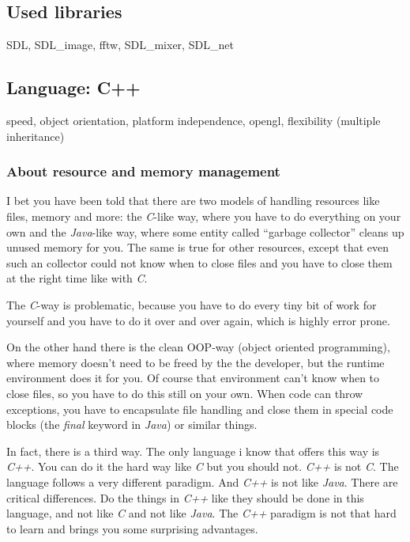 \documentclass{report}
\begin{document}
\subsection{Used libraries}

SDL, SDL\_image, fftw, SDL\_mixer, SDL\_net

\subsection{Language: C++}

speed, object orientation, platform independence, opengl, flexibility (multiple inheritance)

\subsubsection{About resource and memory management}

I bet you have been told that there are two models of handling resources
like files, memory and more: the \emph{C}-like way, where you have to do
everything on your own and the \emph{Java}-like way, where some entity
called ``garbage collector'' cleans up unused memory for you. The same
is true for other resources, except that even such an collector could
not know when to close files and you have to close them at the right
time like with \emph{C}.

The \emph{C}-way is problematic, because you have to do every tiny bit
of work for yourself and you have to do it over and over again, which is
highly error prone.

On the other hand there is the clean OOP-way (object oriented
programming), where memory doesn't need to be freed by the the
developer, but the runtime environment does it for you. Of course that
environment can't know when to close files, so you have to do this still
on your own. When code can throw exceptions, you have to encapsulate
file handling and close them in special code blocks (the \emph{final}
keyword in \emph{Java}) or similar things.

In fact, there is a third way. The only language i know that offers this
way is \emph{C++}. You can do it the hard way like \emph{C} but you
should not. \emph{C++} is not \emph{C}. The language follows a very
different paradigm. And \emph{C++} is not like \emph{Java}. There are
critical differences. Do the things in \emph{C++} like they should be
done in this language, and not like \emph{C} and not like \emph{Java}.
The \emph{C++} paradigm is not that hard to learn and brings you some
surprising advantages.
\end{document}
